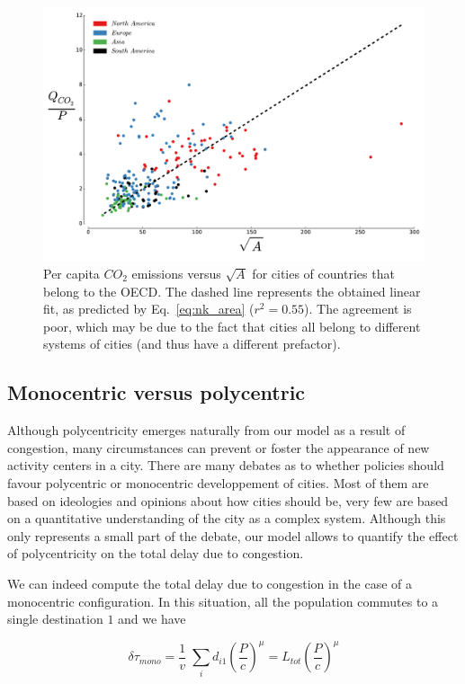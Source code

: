 \begin{figure}
    \centering
    \includegraphics[width=\textwidth]{gfx/chapter-scaling/nk_model.pdf}
    \caption{Per capita $CO_2$ emissions versus $\sqrt{A}$ for cities of
    countries that belong to the OECD. The dashed line represents the obtained
linear fit, as predicted by Eq.~\ref{eq:nk_area} ($r^2=0.55$). The agreement is
poor, which may be due to the fact that cities all belong to different systems
of cities (and thus have a different prefactor).\label{fig:nk_model}}
\end{figure}

\subsection{Monocentric versus polycentric}

Although polycentricity emerges naturally from our model as a result of congestion, many circumstances can prevent or foster the appearance of new activity centers in a city. There are many debates as to whether policies should favour polycentric or monocentric developpement of cities. Most of them are based on ideologies and opinions about how cities should be, very few are based on a quantitative understanding of the city as a complex system. Although this only represents a small part of the debate, our model allows to quantify the effect of polycentricity on the total delay due to congestion.

We can indeed compute the total delay due to congestion in the case of a monocentric configuration. In this situation, all the population commutes to a single destination $1$ and we have

\begin{equation}
    \delta \tau_{mono} = \frac{1}{v}\; \sum_i d_{i1} \left(\frac{P}{c} \right)^\mu = L_{tot} \left(\frac{P}{c} \right)^\mu
\end{equation}

